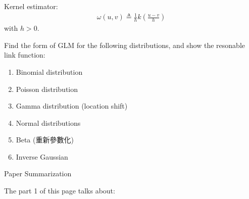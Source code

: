 \documentclass[UTF8,a4paper,10pt]{article}
\begin{document}
\begin{mybox}{}
  Kernel estimator: 
  \begin{equation*}
    \begin{aligned}
      \omega(u,v)\triangleq \frac{1}{h}k(\frac{u-v}{h})
    \end{aligned}
  \end{equation*}
  with \(h>0\).
  


\end{mybox}




  \begin{Problem}[]{}
    Find the form of GLM for the following distributions, and show the resonable link function:
    \begin{enumerate}
      \item Binomial distribution
      \item Poisson distribution
      \item Gamma distribution (location shift)
      \item Normal distributions
      \item Beta (重新參數化)
      \item Inverse Gaussian
    \end{enumerate}
    
  \end{Problem}

  
  \begin{Problem}[]{}
  Paper Summarization
    
  \end{Problem}

  The part 1 of this page talks about:
\end{document}
